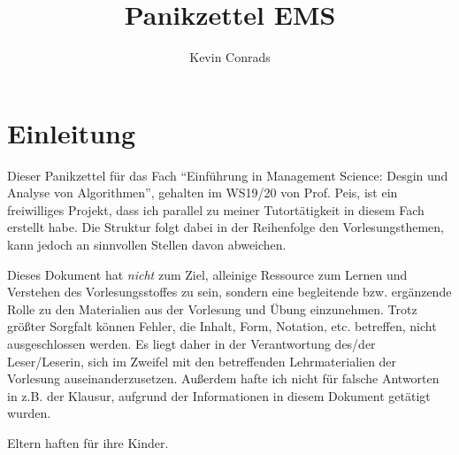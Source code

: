 \documentclass{panikzettel}
\title{Panikzettel EMS}
\author{Kevin Conrads}
\begin{document}
\maketitle

\tableofcontents

\section{Einleitung}
Dieser Panikzettel für das Fach ``Einführung in Management Science: Desgin und Analyse von Algorithmen'', gehalten im WS19/20 von Prof. Peis, ist ein freiwilliges Projekt, dass ich parallel zu meiner Tutortätigkeit in diesem Fach erstellt habe. Die Struktur folgt dabei in der Reihenfolge den Vorlesungsthemen, kann jedoch an sinnvollen Stellen davon abweichen.

Dieses Dokument hat \emph{nicht} zum Ziel, alleinige Ressource zum Lernen und Verstehen des Vorlesungsstoffes zu sein, sondern eine begleitende bzw. ergänzende Rolle zu den Materialien aus der Vorlesung und Übung einzunehmen. Trotz größter Sorgfalt können Fehler, die Inhalt, Form, Notation, etc. betreffen, nicht ausgeschlossen werden. Es liegt daher in der Verantwortung des/der Leser/Leserin, sich im Zweifel mit den betreffenden Lehrmaterialien der Vorlesung auseinanderzusetzen. Außerdem hafte ich nicht für falsche Antworten in z.B. der Klausur, aufgrund der Informationen in diesem Dokument getätigt wurden. 

Eltern haften für ihre Kinder.

\end{document}
